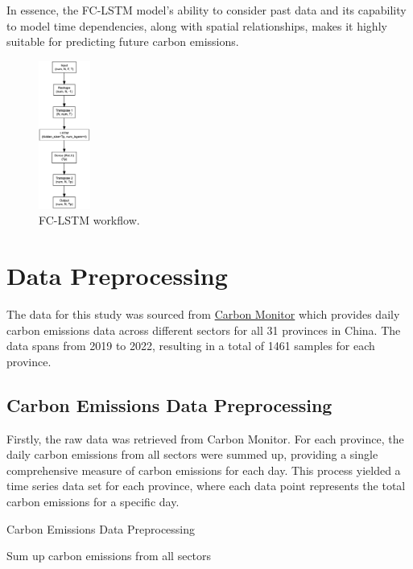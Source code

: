 \documentclass[sigconf, authordraft]{acmart}
\begin{document}
In essence, the FC-LSTM model's ability to consider past data and its capability
to model time dependencies, along with spatial relationships, makes it highly suitable
for predicting future carbon emissions.

\begin{figure}[ht]
	\centering
	\includegraphics[width=0.15\textwidth]{figures/FC-LSTM_flow.png}
	\caption{FC-LSTM workflow.}
	\label{fig:FC-LSTM_flow}
\end{figure}

\section{Data Preprocessing}


The data for this study was sourced from
\href{https://cn.carbonmonitor.org/}{Carbon Monitor} which provides daily
carbon emissions data across different sectors for all 31 provinces in China. The
data spans from 2019 to 2022, resulting in a total of 1461 samples for each
province.

\subsection{Carbon Emissions Data Preprocessing}


Firstly, the raw data was retrieved from Carbon Monitor. For each province, the
daily carbon emissions from all sectors were summed up, providing a single
comprehensive measure of carbon emissions for each day. This process yielded a
time series data set for each province, where each data point represents the
total carbon emissions for a specific day.

\begin{algorithm}
	\caption{Carbon Emissions Data Preprocessing}
	\begin{algorithmic}
		[1]   \State Sum up carbon
		emissions from all sectors \EndFor \EndFor
	\end{algorithmic}
\end{algorithm}
\end{document}
